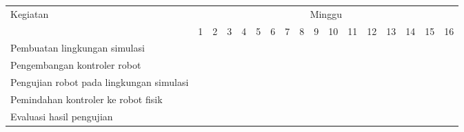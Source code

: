 \newcommand{\w}{}
\newcommand{\G}{\cellcolor{gray}}
\begin{table}[h!]
  \begin{tabular}{|p{42mm}|c|c|c|c|c|c|c|c|c|c|c|c|c|c|c|c|}

    \hline
    \multirow{2}{*}{Kegiatan} & \multicolumn{16}{|c|}{Minggu} \\
    \cline{2-17} &
    1 & 2 & 3 & 4 & 5 & 6 & 7 & 8 & 9 & 10 & 11 & 12 & 13 & 14 & 15 & 16 \\
    \hline

    Pembuatan lingkungan simulasi &
    \G & \G & \G & \G & \G & \G & \w & \w & \w & \w & \w & \w & \w & \w & \w & \w \\
    \hline

    Pengembangan kontroler robot &
    \w & \w & \G & \G & \G & \G & \G & \G & \G & \G & \G & \G & \G & \G & \w & \w \\
    \hline

    Pengujian robot pada lingkungan simulasi &
    \w & \w & \w & \w & \w & \w & \w & \w & \G & \G & \G & \G & \w & \w & \w & \w \\
    \hline

    Pemindahan kontroler ke robot fisik &
    \w & \w & \w & \w & \w & \w & \w & \w & \w & \w & \w & \w & \G & \G & \w & \w \\
    \hline

    Evaluasi hasil pengujian &
    \w & \w & \w & \w & \w & \w & \w & \w & \w & \w & \w & \w & \w & \w & \G & \G \\
    \hline

  \end{tabular}
\end{table}
